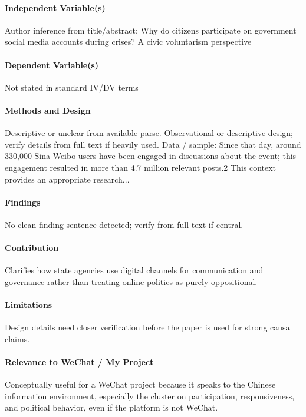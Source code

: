 \documentclass[12pt]{article}
\begin{document}
\paragraph{Independent Variable(s)} Author inference from title/abstract: Why do citizens participate on government social media accounts during crises? A civic voluntarism perspective

\paragraph{Dependent Variable(s)} Not stated in standard IV/DV terms

\paragraph{Methods and Design} Descriptive or unclear from available parse. Observational or descriptive design; verify details from full text if heavily used. Data / sample: Since that day, around 330,000 Sina Weibo users have been engaged in discussions about the event; this engagement resulted in more than 4.7 million relevant posts.2 This context provides an appropriate research...

\paragraph{Findings} No clean finding sentence detected; verify from full text if central.

\paragraph{Contribution} Clarifies how state agencies use digital channels for communication and governance rather than treating online politics as purely oppositional.

\paragraph{Limitations} Design details need closer verification before the paper is used for strong causal claims.

\paragraph{Relevance to WeChat / My Project} Conceptually useful for a WeChat project because it speaks to the Chinese information environment, especially the cluster on participation, responsiveness, and political behavior, even if the platform is not WeChat.
\end{document}

